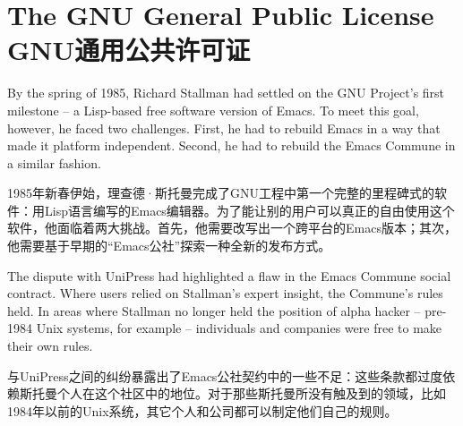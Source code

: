 

\chapter{\ifdefined\eng
The GNU General Public License
\fi
\ifdefined\chs
GNU通用公共许可证
\fi} \label{chapter:gpl}


\ifdefined\eng
By the spring of 1985, Richard Stallman had settled on the GNU Project's first milestone -- a Lisp-based free software version of Emacs. To meet this goal, however, he faced two challenges. First, he had to rebuild Emacs in a way that made it platform independent. Second, he had to rebuild the Emacs Commune in a similar fashion.
\fi

\ifdefined\chs
1985年新春伊始，理查德·斯托曼完成了GNU工程中第一个完整的里程碑式的软件：用Lisp语言编写的Emacs编辑器。为了能让别的用户可以真正的自由使用这个软件，他面临着两大挑战。首先，他需要改写出一个跨平台的Emacs版本；其次，他需要基于早期的``Emacs公社''探索一种全新的发布方式。
\fi

\ifdefined\eng
The dispute with UniPress had highlighted a flaw in the Emacs Commune social contract. Where users relied on Stallman's expert insight, the Commune's rules held. In areas where Stallman no longer held the position of alpha hacker -- pre-1984 Unix systems, for example -- individuals and companies were free to make their own rules.
\fi

\ifdefined\chs
与UniPress之间的纠纷暴露出了Emacs公社契约中的一些不足：这些条款都过度依赖斯托曼个人在这个社区中的地位。对于那些斯托曼所没有触及到的领域，比如1984年以前的Unix系统，其它个人和公司都可以制定他们自己的规则。
\fi

